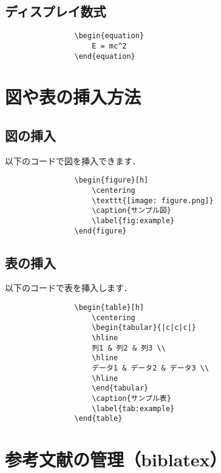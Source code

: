         \subsection{ディスプレイ数式}
            \begin{verbatim}
                \begin{equation}
                    E = mc^2
                \end{equation}
            \end{verbatim}

    \section{図や表の挿入方法}
        \subsection{図の挿入}
        以下のコードで図を挿入できます．
            \begin{verbatim}
                \begin{figure}[h]
                    \centering
                    \texttt{[image: figure.png]}
                    \caption{サンプル図}
                    \label{fig:example}
                \end{figure}
            \end{verbatim}

        \subsection{表の挿入}
        以下のコードで表を挿入します．
            \begin{verbatim}
                \begin{table}[h]
                    \centering
                    \begin{tabular}{|c|c|c|}
                    \hline
                    列1 & 列2 & 列3 \\
                    \hline
                    データ1 & データ2 & データ3 \\
                    \hline
                    \end{tabular}
                    \caption{サンプル表}
                    \label{tab:example}
                \end{table}
            \end{verbatim}

    \section{参考文献の管理（biblatex）}
